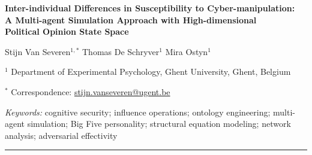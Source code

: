 \documentclass[11pt,a4paper]{article}
\begin{document}
\begin{center}
{\LARGE\bfseries
  Inter-individual Differences in Susceptibility to Cyber-manipulation:\\
  A Multi-agent Simulation Approach with High-dimensional\\
  Political Opinion State Space\par}
\vspace{1em}
{\normalsize
Stijn Van Severen$^{1,*}$ \quad Thomas De Schryver$^1$ \quad Mira Ostyn$^1$\par}
\vspace{0.4em}
{\small $^1$ Department of Experimental Psychology, Ghent University, Ghent, Belgium\par}
{\small $^*$ Correspondence: \href{mailto:stijn.vanseveren@ugent.be}{stijn.vanseveren@ugent.be}\par}
\vspace{0.4em}
{\small \textit{Keywords:} cognitive security; influence operations; ontology engineering; multi-agent simulation; Big Five personality; structural equation modeling; network analysis; adversarial effectivity\par}
\end{center}

\vspace{0.5em}
\hrule
\vspace{0.6em}
\end{document}

